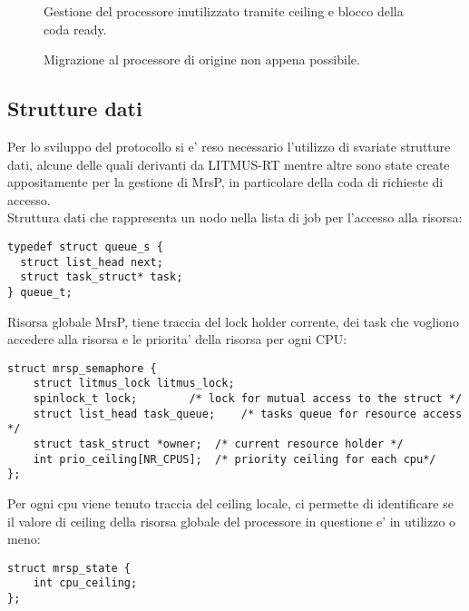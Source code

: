 \documentclass[a4paper,11pt]{article}
\begin{document}
\begin{figure}
	\ModelloConcettualeEighth
	\centering
	\caption{Gestione del processore inutilizzato tramite ceiling e blocco della coda ready.}
	\label{eighth}
\end{figure}

\begin{figure}
	\ModelloConcettualeNineth
	\caption{Migrazione al processore di origine non appena possibile.}
	\label{nineth}
\end{figure}

\subsection{Strutture dati}

\noindent Per lo sviluppo del protocollo si e' reso necessario l'utilizzo di svariate strutture dati, alcune delle quali derivanti da LITMUS-RT mentre altre sono state create appositamente per la gestione di MrsP, in particolare della coda di richieste di accesso.\\

\noindent Struttura dati che rappresenta un nodo nella lista di job per l'accesso alla risorsa:

\begin{lstlisting}
typedef struct queue_s {
  struct list_head next;
  struct task_struct* task;
} queue_t;
\end{lstlisting}
\hspace{0.2mm}

\noindent Risorsa globale MrsP, tiene traccia del lock holder corrente, dei task che vogliono accedere alla risorsa e le priorita' della risorsa per ogni CPU:

\begin{lstlisting}
struct mrsp_semaphore {
	struct litmus_lock litmus_lock;
	spinlock_t lock;		/* lock for mutual access to the struct */
	struct list_head task_queue;	/* tasks queue for resource access */
	struct task_struct *owner;	/* current resource holder */
	int prio_ceiling[NR_CPUS]; 	/* priority ceiling for each cpu*/
};
\end{lstlisting}
\hspace{0.2mm}

\noindent Per ogni cpu viene tenuto traccia del ceiling locale, ci permette di identificare se il valore di ceiling della risorsa globale del processore in questione e' in utilizzo o meno:

\begin{lstlisting}
struct mrsp_state {
	int cpu_ceiling;
};
\end{lstlisting}
\hspace{0.2mm}
\end{document}
